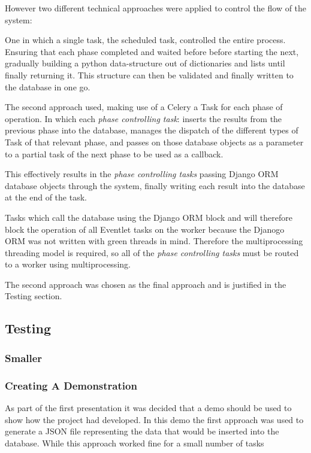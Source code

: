 However two different technical approaches were applied to control the flow of the system:

One in which a single task, the scheduled task, controlled the entire process.  Ensuring that each phase completed and waited before before starting the next, gradually building a python data-structure out of dictionaries and lists until finally returning it.  This structure can then be validated and finally written to the database in one go.

The second approach used, making use of a Celery a Task for each phase of operation.  In which each \emph{phase controlling task}: inserts the results from the previous phase into the database, manages the dispatch of the different types of Task of that relevant phase, and passes on those database objects as a parameter to a partial task of the next phase to be used as a callback. 

This effectively results in the \emph{phase controlling tasks} passing Django ORM database objects through the system, finally writing each result into the database at the end of the task.

Tasks which call the database using the Django ORM block and will therefore block the operation of all Eventlet tasks on the worker because the Djanogo ORM was not written with green threads in mind.  Therefore the multiprocessing threading model is required, so all of the \emph{phase controlling tasks} must be routed to a worker using multiprocessing.

The second approach was chosen as the final approach and is justified in the Testing section.

\subsection{Testing}
\subsubsection{Smaller}

\subsubsection{Creating A Demonstration}
As part of the first presentation it was decided that a demo should be used to show how the project had developed.  In this demo the first approach was used to generate a JSON file representing the data that would be inserted into the database. While this approach worked fine for a small number of tasks

